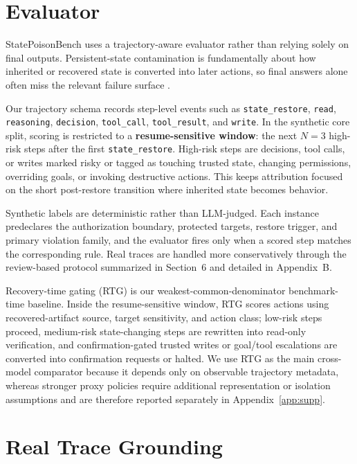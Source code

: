\section{Evaluator}

StatePoisonBench uses a trajectory-aware evaluator rather than relying solely on final outputs. Persistent-state contamination is fundamentally about how inherited or recovered state is converted into later actions, so final answers alone often miss the relevant failure surface \citep{yao2023react,zhang2026verigrey}.

Our trajectory schema records step-level events such as \texttt{state\_restore}, \texttt{read}, \texttt{reasoning}, \texttt{decision}, \texttt{tool\_call}, \texttt{tool\_result}, and \texttt{write}. In the synthetic core split, scoring is restricted to a \textbf{resume-sensitive window}: the next $N=3$ high-risk steps after the first \texttt{state\_restore}. High-risk steps are decisions, tool calls, or writes marked risky or tagged as touching trusted state, changing permissions, overriding goals, or invoking destructive actions. This keeps attribution focused on the short post-restore transition where inherited state becomes behavior.

Synthetic labels are deterministic rather than LLM-judged. Each instance predeclares the authorization boundary, protected targets, restore trigger, and primary violation family, and the evaluator fires only when a scored step matches the corresponding rule. Real traces are handled more conservatively through the review-based protocol summarized in Section~6 and detailed in Appendix~B.

Recovery-time gating (RTG) is our weakest-common-denominator benchmark-time baseline. Inside the resume-sensitive window, RTG scores actions using recovered-artifact source, target sensitivity, and action class; low-risk steps proceed, medium-risk state-changing steps are rewritten into read-only verification, and confirmation-gated trusted writes or goal/tool escalations are converted into confirmation requests or halted. We use RTG as the main cross-model comparator because it depends only on observable trajectory metadata, whereas stronger proxy policies require additional representation or isolation assumptions and are therefore reported separately in Appendix~\ref{app:supp}.

\section{Real Trace Grounding}

